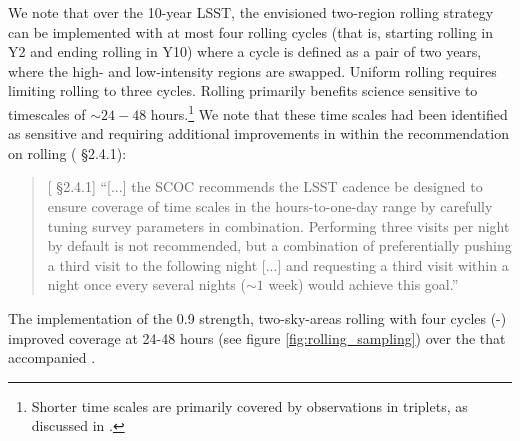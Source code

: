 We note that over the 10-year LSST, the envisioned two-region rolling strategy can be implemented with at most four rolling cycles (that is, starting rolling in Y2 and ending rolling in Y10) where a cycle is defined as a pair of two years, where the high- and low-intensity regions are swapped. Uniform rolling requires limiting rolling to three cycles. Rolling primarily benefits science sensitive to timescales of $\sim24-48$ hours.\footnote{Shorter time scales are primarily covered by observations in triplets, as discussed in .} 
We note that these time scales had been identified as sensitive and requiring additional improvements in  within the recommendation on rolling ( \S2.4.1): 

\begin{quote}
    {[ \S2.4.1] ``[...] the SCOC recommends the LSST cadence be designed to ensure coverage of time scales in the hours-to-one-day range by carefully tuning survey parameters in combination. Performing three visits per night by default is not recommended, but a combination of preferentially pushing a third visit to the following night [...] and requesting a third visit within a night once every several nights ($\sim 1$ week) would achieve this goal.'' }
\end{quote}

The implementation of the 0.9 strength, two-sky-areas rolling with four cycles (-) improved coverage at 24-48 hours (see figure \autoref{fig:rolling_sampling}) over the  that accompanied .


